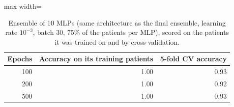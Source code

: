 \begin{table}[H]
\centering
\small
\setlength{\tabcolsep}{4pt}
\begin{adjustbox}{max width=\linewidth}
\begin{tabular}{rrr}
\toprule
Epochs & Accuracy on its training patients & 5-fold CV accuracy \\
\midrule
100 & 1.00 & 0.93 \\
200 & 1.00 & 0.92 \\
500 & 1.00 & 0.93 \\
\bottomrule
\end{tabular}
\end{adjustbox}
\caption{Ensemble of 10 MLPs (same architecture as the final ensemble, learning rate $10^{-3}$, batch 30, 75\% of the patients per MLP), scored on the patients it was trained on and by cross-validation.}
\label{tab:supp-mlp}
\end{table}
